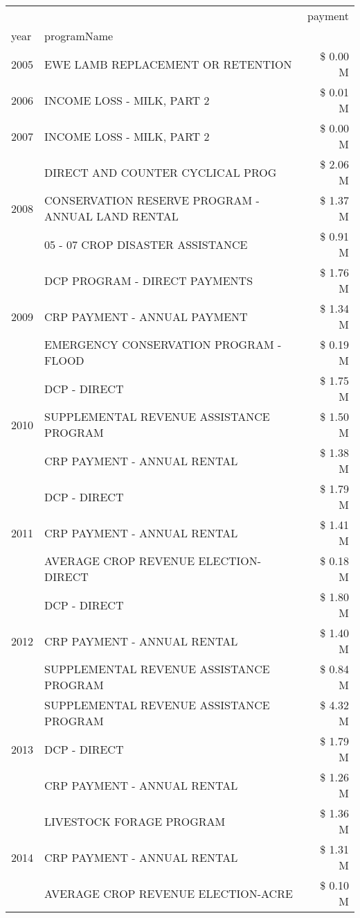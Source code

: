 \begin{tabular}{llr}
\toprule
 &  & payment \\
year & programName &  \\
\midrule
2005 & EWE LAMB REPLACEMENT OR RETENTION & \$ 0.00 M \\
\cline{1-3}
2006 & INCOME LOSS - MILK, PART 2 & \$ 0.01 M \\
\cline{1-3}
2007 & INCOME LOSS - MILK, PART 2 & \$ 0.00 M \\
\cline{1-3}
\multirow[t]{3}{*}{2008} & DIRECT AND COUNTER CYCLICAL PROG & \$ 2.06 M \\
 & CONSERVATION RESERVE PROGRAM - ANNUAL LAND RENTAL & \$ 1.37 M \\
 & 05 - 07 CROP DISASTER ASSISTANCE & \$ 0.91 M \\
\cline{1-3}
\multirow[t]{3}{*}{2009} & DCP PROGRAM - DIRECT PAYMENTS & \$ 1.76 M \\
 & CRP PAYMENT - ANNUAL PAYMENT & \$ 1.34 M \\
 & EMERGENCY CONSERVATION PROGRAM - FLOOD & \$ 0.19 M \\
\cline{1-3}
\multirow[t]{3}{*}{2010} & DCP - DIRECT & \$ 1.75 M \\
 & SUPPLEMENTAL REVENUE ASSISTANCE PROGRAM & \$ 1.50 M \\
 & CRP PAYMENT - ANNUAL RENTAL & \$ 1.38 M \\
\cline{1-3}
\multirow[t]{3}{*}{2011} & DCP - DIRECT & \$ 1.79 M \\
 & CRP PAYMENT - ANNUAL RENTAL & \$ 1.41 M \\
 & AVERAGE CROP REVENUE ELECTION-DIRECT & \$ 0.18 M \\
\cline{1-3}
\multirow[t]{3}{*}{2012} & DCP - DIRECT & \$ 1.80 M \\
 & CRP PAYMENT - ANNUAL RENTAL & \$ 1.40 M \\
 & SUPPLEMENTAL REVENUE ASSISTANCE PROGRAM & \$ 0.84 M \\
\cline{1-3}
\multirow[t]{3}{*}{2013} & SUPPLEMENTAL REVENUE ASSISTANCE PROGRAM & \$ 4.32 M \\
 & DCP - DIRECT & \$ 1.79 M \\
 & CRP PAYMENT - ANNUAL RENTAL & \$ 1.26 M \\
\cline{1-3}
\multirow[t]{3}{*}{2014} & LIVESTOCK FORAGE PROGRAM & \$ 1.36 M \\
 & CRP PAYMENT - ANNUAL RENTAL & \$ 1.31 M \\
 & AVERAGE CROP REVENUE ELECTION-ACRE & \$ 0.10 M \\
\cline{1-3}

\end{tabular}
